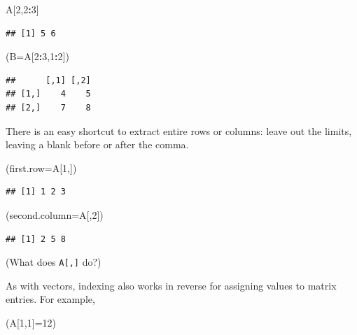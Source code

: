 \documentclass[11pt,]{article}
\newenvironment{Shaded}{\begin{snugshade}}{\end{snugshade}}
\newcommand{\DataTypeTok}[1]{\textcolor[rgb]{0.13,0.29,0.53}{#1}}
\newcommand{\DecValTok}[1]{\textcolor[rgb]{0.00,0.00,0.81}{#1}}
\newcommand{\NormalTok}[1]{#1}
\newcommand{\OperatorTok}[1]{\textcolor[rgb]{0.81,0.36,0.00}{\textbf{#1}}}
\begin{document}
\begin{Shaded}
\begin{Highlighting}[]
\NormalTok{A[}\DecValTok{2}\NormalTok{,}\DecValTok{2}\OperatorTok{:}\DecValTok{3}\NormalTok{]}
\end{Highlighting}
\end{Shaded}

\begin{verbatim}
## [1] 5 6
\end{verbatim}

\begin{Shaded}
\begin{Highlighting}[]
\NormalTok{(}\DataTypeTok{B=}\NormalTok{A[}\DecValTok{2}\OperatorTok{:}\DecValTok{3}\NormalTok{,}\DecValTok{1}\OperatorTok{:}\DecValTok{2}\NormalTok{])}
\end{Highlighting}
\end{Shaded}

\begin{verbatim}
##      [,1] [,2]
## [1,]    4    5
## [2,]    7    8
\end{verbatim}

There is an easy shortcut to extract entire rows or columns: leave out the limits, leaving a blank before or after the comma.

\begin{Shaded}
\begin{Highlighting}[]
\NormalTok{(}\DataTypeTok{first.row=}\NormalTok{A[}\DecValTok{1}\NormalTok{,])}
\end{Highlighting}
\end{Shaded}

\begin{verbatim}
## [1] 1 2 3
\end{verbatim}

\begin{Shaded}
\begin{Highlighting}[]
\NormalTok{(}\DataTypeTok{second.column=}\NormalTok{A[,}\DecValTok{2}\NormalTok{])}
\end{Highlighting}
\end{Shaded}

\begin{verbatim}
## [1] 2 5 8
\end{verbatim}

(What does \texttt{A{[},{]}} do?)

As with vectors, indexing also works in reverse for assigning values to matrix entries. For example,

\begin{Shaded}
\begin{Highlighting}[]
\NormalTok{(A[}\DecValTok{1}\NormalTok{,}\DecValTok{1}\NormalTok{]=}\DecValTok{12}\NormalTok{)}
\end{Highlighting}
\end{Shaded}
\end{document}

